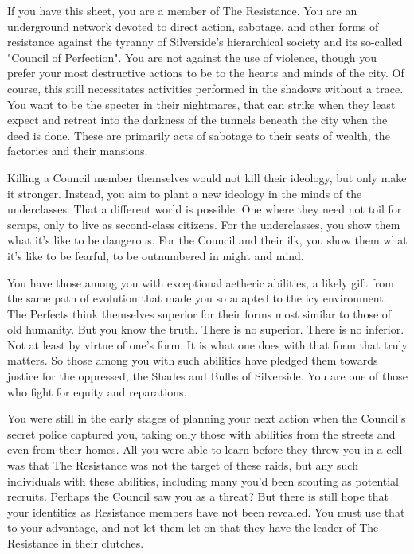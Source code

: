 \documentclass[blue]{Silversiders}
\begin{document}
\name{\bResistance{}}

If you have this sheet, you are a member of The Resistance. You are an underground network devoted to direct action, sabotage, and other forms of resistance against the tyranny of Silverside's hierarchical society and its so-called "Council of Perfection". You are not against the use of violence, though you prefer your most destructive actions to be to the hearts and minds of the city. Of course, this still necessitates activities performed in the shadows without a trace. You want to be the specter in their nightmares, that can strike when they least expect and retreat into the darkness of the tunnels beneath the city when the deed is done. These are primarily acts of sabotage to their seats of wealth, the factories and their mansions. 

Killing a Council member themselves would not kill their ideology, but only make it stronger. Instead, you aim to plant a new ideology in the minds of the underclasses. That a different world is possible. One where they need not toil for scraps, only to live as second-class citizens. For the underclasses, you show them what it's like to be dangerous. For the Council and their ilk, you show them what it's like to be fearful, to be outnumbered in might and mind.

You have those among you with exceptional aetheric abilities, a likely gift from the same path of evolution that made you so adapted to the icy environment. The Perfects think themselves superior for their forms most similar to those of old humanity. But you know the truth. There is no superior. There is no inferior. Not at least by virtue of one's form. It is what one does with that form that truly matters. So those among you with such abilities have pledged them towards justice for the oppressed, the Shades and Bulbs of Silverside. You are one of those who fight for equity and reparations.

You were still in the early stages of planning your next action when the Council's secret police captured you, taking only those with abilities from the streets and even from their homes. All you were able to learn before they threw you in a cell was that The Resistance was not the target of these raids, but any such individuals with these abilities, including many you'd been scouting as potential recruits. Perhaps the Council saw you as a threat? But there is still hope that your identities as Resistance members have not been revealed.  You must use that to your advantage, and not let them let on that they have the leader of The Resistance in their clutches.
\end{document}
